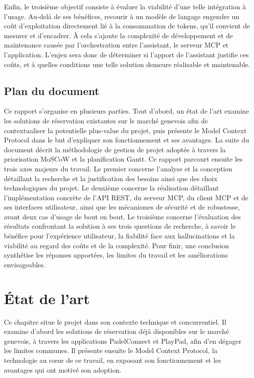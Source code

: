 \documentclass[12pt]{article}
\let\stdsection\section
\renewcommand{\section}{\clearpage\stdsection}
\begin{document}
\newline\newline
Enfin, le troisième objectif consiste à évaluer la viabilité d'une telle intégration à l'usage. Au-delà de ses bénéfices, recourir à un modèle de langage engendre un coût d'exploitation directement lié à la consommation de tokens, qu'il convient de mesurer et d'encadrer. À cela s'ajoute la complexité de développement et de maintenance causée par l'orchestration entre l'assistant, le serveur MCP et l'application. L'enjeu sera donc de déterminer si l'apport de l'assistant justifie ces coûts, et à quelles conditions une telle solution demeure réalisable et maintenable.
\subsection{Plan du document}
Ce rapport s'organise en plusieurs parties. Tout d'abord, un état de l'art examine les solutions de réservation existantes sur le marché genevois afin de contextualiser la potentielle plus-value du projet, puis présente le Model Context Protocol dans le but d'expliquer son fonctionnement et ses avantages.
\newline\newline
La suite du document décrit la méthodologie de gestion de projet adoptée à travers la priorisation MoSCoW et la planification Gantt.
\newline\newline
Ce rapport parcourt ensuite les trois axes majeurs du travail. Le premier concerne l'analyse et la conception détaillant la recherche et la justification des besoins ainsi que des choix technologiques du projet. Le deuxième concerne la réalisation détaillant l'implémentation concrète de l'API REST, du serveur MCP, du client MCP et de ses interfaces utilisateur, ainsi que les mécanismes de sécurité et de robustesse, avant deux cas d'usage de bout en bout. Le troisième concerne l'évaluation des résultats confrontant la solution à ses trois questions de recherche, à savoir le bénéfice pour l'expérience utilisateur, la fiabilité face aux hallucinations et la viabilité au regard des coûts et de la complexité.
\newline\newline
Pour finir, une conclusion synthétise les réponses apportées, les limites du travail et les améliorations envisageables.
\section{État de l'art}
Ce chapitre situe le projet dans son contexte technique et concurrentiel. Il examine d'abord les solutions de réservation déjà disponibles sur le marché genevois, à travers les applications PadelConnect et PlayPad, afin d'en dégager les limites communes. Il présente ensuite le Model Context Protocol, la technologie au cœur de ce travail, en exposant son fonctionnement et les avantages qui ont motivé son adoption.
\end{document}
